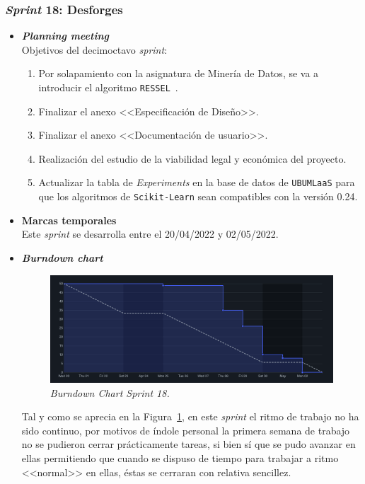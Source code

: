 \subsubsection{\textit{Sprint} 18: Desforges}
\begin{itemize}
\item \textbf{\textit{Planning meeting}}\\
Objetivos del decimoctavo \textit{sprint}:
\begin{enumerate}
\item Por solapamiento con la asignatura de Minería de Datos, se va a introducir el algoritmo \texttt{RESSEL}~\cite{de2021reliable}.
\item Finalizar el anexo <<Especificación de Diseño>>.
\item Finalizar el anexo <<Documentación de usuario>>.
\item Realización del estudio de la viabilidad legal y económica del proyecto.
\item Actualizar la tabla de \emph{Experiments} en la base de datos de \texttt{UBUMLaaS} para que los algoritmos de \texttt{Scikit-Learn} sean compatibles con la versión 0.24.
\end{enumerate}

\item \textbf{Marcas temporales}\\
Este \textit{sprint} se desarrolla entre el 20/04/2022 y 02/05/2022.

\item \textbf{\textit{Burndown chart}}\\
\begin{figure}
\begin{center}
\includegraphics[width=\textwidth]{../img/anexos/sprints/BD-Sprint18}
\caption{\textit{Burndown Chart Sprint 18.}}\label{fig:BD-Sprint18}
\end{center}
\end{figure}
Tal y como se aprecia en la Figura~\ref{fig:BD-Sprint18}, en este \textit{sprint} el ritmo de trabajo no ha sido continuo, por motivos de índole personal la primera semana de trabajo no se pudieron cerrar prácticamente tareas, si bien sí que se pudo avanzar en ellas permitiendo que cuando se dispuso de tiempo para trabajar a ritmo <<normal>> en ellas, éstas se cerraran con relativa sencillez.


\end{itemize}
